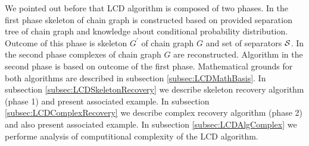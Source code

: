 %
%


We pointed out before that LCD algorithm is composed of two phases. In the first phase
skeleton of chain graph is constructed based on provided separation tree of chain graph and 
knowledge about conditional probability distribution. Outcome of this phase is skeleton $G^{'}$ of chain
graph $G$ and set of separators $\mathcal{S}$. In the second phase complexes of chain graph $G$ are 
reconstructed. Algorithm in the second phase is based on outcome of the first phase. 
Mathematical grounds for both algorithms are described in subsection \ref{subsec:LCDMathBasis}.
In subsection \ref{subsec:LCDSkeletonRecovery} we describe skeleton recovery algorithm (phase 1) and
present associated example. In subsection \ref{subsec:LCDComplexRecovery} we describe complex recovery 
algorithm (phase 2) and also present associated example. In subsection \ref{subsec:LCDAlgComplex} we 
performe analysis of computitional complexity of the LCD algorithm. 




